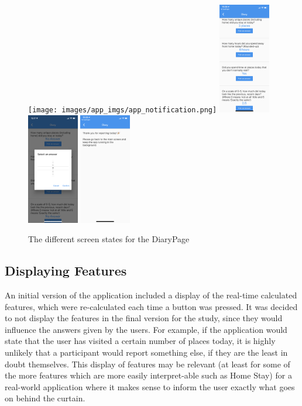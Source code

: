 \begin{figure}
    \centering
    \texttt{[image: images/app\_imgs/app\_notification.png]} \includegraphics[width=0.2\textwidth]{images/app_imgs/app_noanswers.png}
    \includegraphics[width=0.2\textwidth]{images/app_imgs/app_answering.png} \includegraphics[width=0.2\textwidth]{images/app_imgs/app_submitted.png}
    \caption{The different screen states for the DiaryPage}
    \label{fig:my_label}
\end{figure}

\subsection{Displaying Features}
An initial version of the application included a display of the real-time calculated features, which were re-calculated each time a button was pressed. It was decided to not display the features in the final version for the study, since they would influence the answers given by the users. For example, if the application would state that the user has visited a certain number of places today, it is highly unlikely that a participant would report something else, if they are the least in doubt themselves. This display of features may be relevant (at least for some of the more features which are more easily interpret-able such as Home Stay) for a real-world application where it makes sense to inform the user exactly what goes on behind the curtain.


